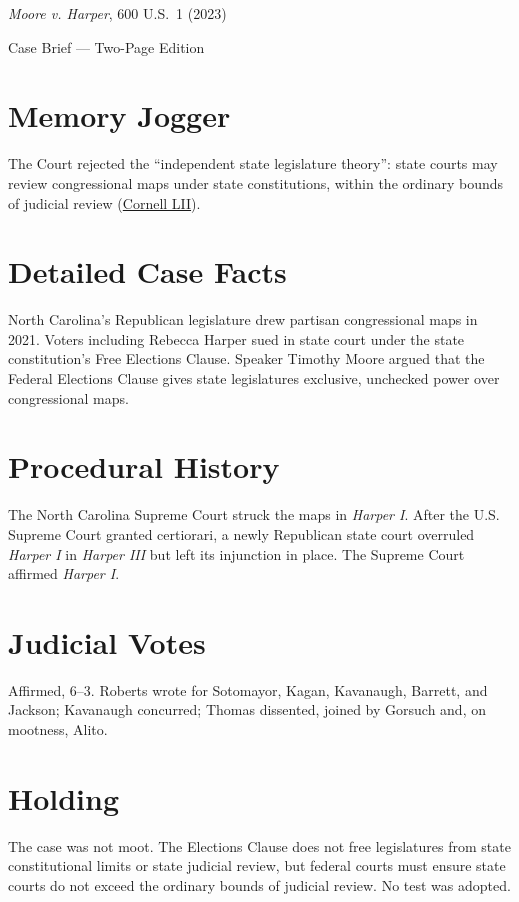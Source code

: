 \documentclass[12pt]{article}
\begin{document}
\begin{center}
{\LARGE \textit{Moore v. Harper}, 600 U.S.\ 1 (2023)\par}
\vspace{0.5em}
{\large Case Brief --- Two-Page Edition\par}
\end{center}

\section{Memory Jogger}
The Court rejected the ``independent state legislature theory'': state courts may review congressional maps under state constitutions, within the ordinary bounds of judicial review (\href{https://www.law.cornell.edu/supremecourt/text/21-1271}{Cornell LII}).

\section{Detailed Case Facts}
North Carolina's Republican legislature drew partisan congressional maps in 2021. Voters including Rebecca Harper sued in state court under the state constitution's Free Elections Clause. Speaker Timothy Moore argued that the Federal Elections Clause gives state legislatures exclusive, unchecked power over congressional maps.

\section{Procedural History}
The North Carolina Supreme Court struck the maps in \textit{Harper I}. After the U.S. Supreme Court granted certiorari, a newly Republican state court overruled \textit{Harper I} in \textit{Harper III} but left its injunction in place. The Supreme Court affirmed \textit{Harper I}.

\section{Judicial Votes}
Affirmed, 6--3. Roberts wrote for Sotomayor, Kagan, Kavanaugh, Barrett, and Jackson; Kavanaugh concurred; Thomas dissented, joined by Gorsuch and, on mootness, Alito.

\section{Holding}
The case was not moot. The Elections Clause does not free legislatures from state constitutional limits or state judicial review, but federal courts must ensure state courts do not exceed the ordinary bounds of judicial review. No test was adopted.
\end{document}
